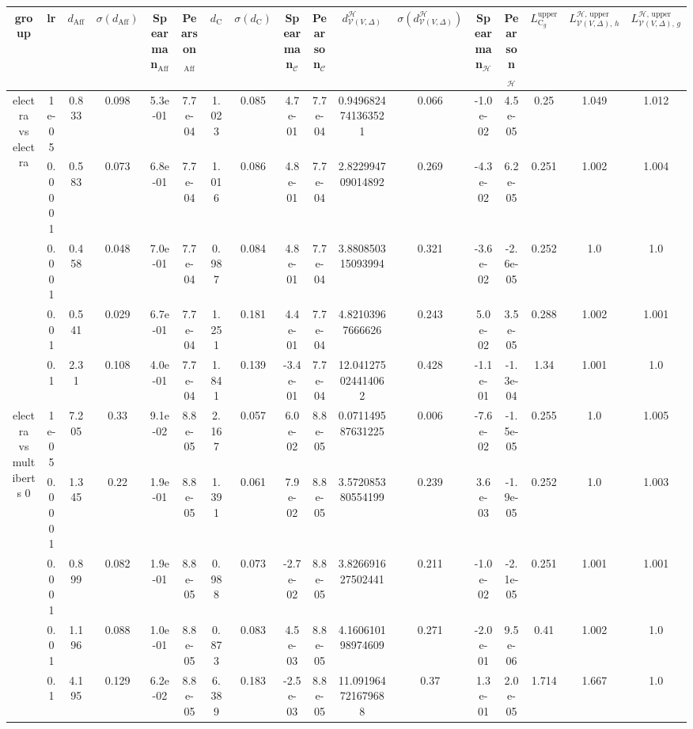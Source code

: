 \begin{tabular}{|c|c|c|c|c|c|c|c|c|c|c|c|c|c|c|c|c|}
\hline
group & lr & $d_{\mathrm{Aff}}$ & $\sigma(d_{\mathrm{Aff}})$ & Spearman$_{\mathrm{Aff}}$ & Pearson$_{\mathrm{Aff}}$ & $d_{\mathrm{C}}$ & $\sigma(d_{\mathrm{C}})$ & Spearman$_{\mathcal{C}}$ & Pearson$_{\mathcal{C}}$ & $d^\mathcal{H}_{\mathcal{V}(V,\Delta)}$ & $\sigma(d^\mathcal{H}_{\mathcal{V}(V,\Delta)})$ & Spearman$_{\mathcal{H}}$ & Pearson$_{\mathcal{H}}$ & $L_{\mathrm{C}_g}^{\mathrm{upper}}$ & $L^{\mathcal{H},\,\mathrm{upper}}_{\mathcal{V}(V,\Delta),\,h}$ & $L^{\mathcal{H},\,\mathrm{upper}}_{\mathcal{V}(V,\Delta),\,g}$ \\
\hline
\multirow{5}{*}{electra  vs electra } & 1e-05 & 0.833 & 0.098 & 5.3e-01 & 7.7e-04 & 1.023 & 0.085 & 4.7e-01 & 7.7e-04 & 0.9496824741363521 & 0.066 & -1.0e-02 & 4.5e-05 & 0.25 & 1.049 & 1.012 \\
 & 0.0001 & 0.583 & 0.073 & 6.8e-01 & 7.7e-04 & 1.016 & 0.086 & 4.8e-01 & 7.7e-04 & 2.822994709014892 & 0.269 & -4.3e-02 & 6.2e-05 & 0.251 & 1.002 & 1.004 \\
 & 0.001 & 0.458 & 0.048 & 7.0e-01 & 7.7e-04 & 0.987 & 0.084 & 4.8e-01 & 7.7e-04 & 3.880850315093994 & 0.321 & -3.6e-02 & -2.6e-05 & 0.252 & 1.0 & 1.0 \\
 & 0.01 & 0.541 & 0.029 & 6.7e-01 & 7.7e-04 & 1.251 & 0.181 & 4.4e-01 & 7.7e-04 & 4.82103967666626 & 0.243 & 5.0e-02 & 3.5e-05 & 0.288 & 1.002 & 1.001 \\
 & 0.1 & 2.31 & 0.108 & 4.0e-01 & 7.7e-04 & 1.841 & 0.139 & -3.4e-01 & 7.7e-04 & 12.041275024414062 & 0.428 & -1.1e-01 & -1.3e-04 & 1.34 & 1.001 & 1.0 \\
\hline
\multirow{5}{*}{electra  vs multiberts 0} & 1e-05 & 7.205 & 0.33 & 9.1e-02 & 8.8e-05 & 2.167 & 0.057 & 6.0e-02 & 8.8e-05 & 0.071149587631225 & 0.006 & -7.6e-02 & -1.5e-05 & 0.255 & 1.0 & 1.005 \\
 & 0.0001 & 1.345 & 0.22 & 1.9e-01 & 8.8e-05 & 1.391 & 0.061 & 7.9e-02 & 8.8e-05 & 3.572085380554199 & 0.239 & 3.6e-03 & -1.9e-05 & 0.252 & 1.0 & 1.003 \\
 & 0.001 & 0.899 & 0.082 & 1.9e-01 & 8.8e-05 & 0.988 & 0.073 & -2.7e-02 & 8.8e-05 & 3.826691627502441 & 0.211 & -1.0e-02 & -2.1e-05 & 0.251 & 1.001 & 1.001 \\
 & 0.01 & 1.196 & 0.088 & 1.0e-01 & 8.8e-05 & 0.873 & 0.083 & 4.5e-03 & 8.8e-05 & 4.160610198974609 & 0.271 & -2.0e-01 & 9.5e-06 & 0.41 & 1.002 & 1.0 \\
 & 0.1 & 4.195 & 0.129 & 6.2e-02 & 8.8e-05 & 6.389 & 0.183 & -2.5e-03 & 8.8e-05 & 11.091964721679688 & 0.37 & 1.3e-01 & 2.0e-05 & 1.714 & 1.667 & 1.0 \\

\end{tabular}
